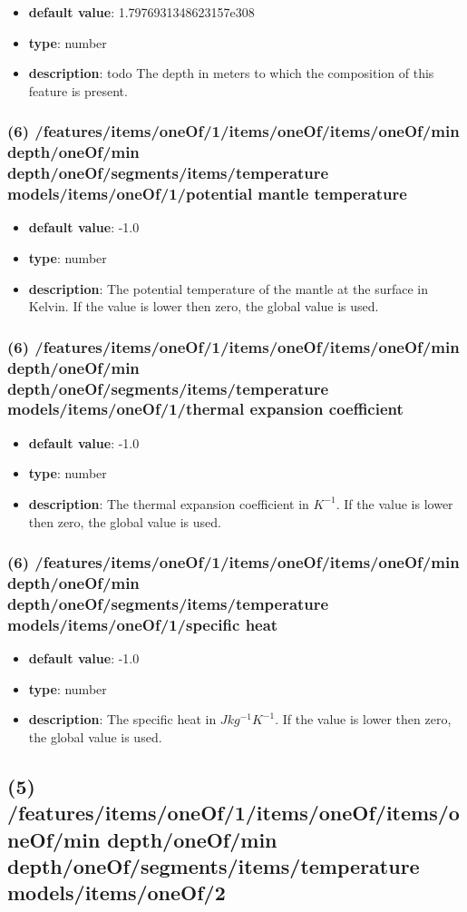 \begin{itemize}[leftmargin=6em]\item {\bf default value}: 1.7976931348623157e308
\item {\bf type}: number
\item {\bf description}: todo The depth in meters to which the composition of this feature is present.
\end{itemize}\subsubsection{(6) /features/items/oneOf/1/items/oneOf/items/oneOf/min depth/oneOf/min depth/oneOf/segments/items/temperature models/items/oneOf/1/potential mantle temperature}
\begin{itemize}[leftmargin=6em]\item {\bf default value}: -1.0
\item {\bf type}: number
\item {\bf description}: The potential temperature of the mantle at the surface in Kelvin. If the value is lower then zero, the global value is used.
\end{itemize}\subsubsection{(6) /features/items/oneOf/1/items/oneOf/items/oneOf/min depth/oneOf/min depth/oneOf/segments/items/temperature models/items/oneOf/1/thermal expansion coefficient}
\begin{itemize}[leftmargin=6em]\item {\bf default value}: -1.0
\item {\bf type}: number
\item {\bf description}: The thermal expansion coefficient in $K^{-1}$. If the value is lower then zero, the global value is used.
\end{itemize}\subsubsection{(6) /features/items/oneOf/1/items/oneOf/items/oneOf/min depth/oneOf/min depth/oneOf/segments/items/temperature models/items/oneOf/1/specific heat}
\begin{itemize}[leftmargin=6em]\item {\bf default value}: -1.0
\item {\bf type}: number
\item {\bf description}: The specific heat in $J kg^{-1} K^{-1}$. If the value is lower then zero, the global value is used.
\end{itemize}\subsection{(5) /features/items/oneOf/1/items/oneOf/items/oneOf/min depth/oneOf/min depth/oneOf/segments/items/temperature models/items/oneOf/2}
